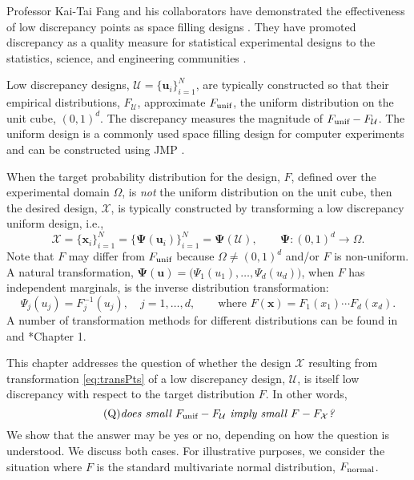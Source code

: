 \documentclass[graybox]{svmult}
\newcommand{\vx}{\boldsymbol{x}}
\newcommand{\vu}{\boldsymbol{u}}
\newcommand{\vPsi}{\boldsymbol{\Psi}}
\newcommand{\Udes}{\mathcal{U}}
\newcommand{\Xdes}{\mathcal{X}}
\newcommand{\Ftar}{F}
\newcommand{\cube}{\ensuremath{(0,1)^d}}
\newcommand{\unif}{\textup{unif}}
\newcommand{\normal}{\textup{normal}}
\begin{document}
Professor Kai-Tai Fang and his collaborators have demonstrated the effectiveness of low discrepancy points as space filling designs \cites{FangHic07a, FangEtal19a, FanLiSud06, FanWan94}. 
They have promoted discrepancy as a quality measure for statistical experimental designs to the statistics, science, and engineering communities \cites{FanMa01b, FanMaWin02, FanMuk00, FanMa01a}. 

Low discrepancy designs, $\Udes = \{\vu_i\}_{i=1}^N$, are typically constructed so that their empirical distributions, $F_\Udes$, approximate $F_\unif$, the uniform distribution on the unit cube, \cube.  
The discrepancy measures the magnitude of $F_\unif-F_\Udes$. 
The uniform design is a commonly used space filling design for computer experiments \cite{FanLiSud06} and can be constructed using  JMP\textsuperscript{\textregistered} \cite{sall2012jmp}.

When the target probability distribution for the design, $\Ftar$, defined over the experimental domain $\Omega$, is \emph{not} the uniform distribution on the unit cube, then the desired design, $\Xdes$, is typically constructed by transforming a low discrepancy uniform design, i.e., 
\begin{equation} \label{eq:transPts}
\Xdes = \{\vx_i\}_{i=1}^N = \{\vPsi(\vu_i)\}_{i=1}^N = \vPsi(\Udes), \qquad \vPsi: \cube \to \Omega.
\end{equation}
Note that $\Ftar$ may differ from $F_\unif$ because $\Omega \ne \cube$ and/or $\Ftar$ is non-uniform.  
A natural transformation, $\vPsi(\vu)=\bigl(\Psi_1(u_1),\ldots,\Psi_d(u_d) \bigr)$, when $\Ftar$ has independent marginals, is the inverse distribution transformation:
\begin{equation}\label{eq:inverse}
\Psi_j(u_j) = F_j^{-1}(u_j), \quad j =1, \ldots, d, \qquad \text{where } \Ftar(\vx) = F_1(x_1) \cdots F_d(x_d).
\end{equation}
A number of transformation methods for different distributions can be found in \cite{DEVROYE200683} and \cite{FanWan94}*{Chapter 1}.

This chapter addresses the question of whether the design $\Xdes$ resulting from transformation \eqref{eq:transPts} of a low discrepancy design, $\Udes$, is itself low discrepancy with respect to the target distribution $\Ftar$. 
In other words, 
\begin{equation} \label{eq:BigQ} \tag{Q}
\text{\emph{does small $F_\unif - F_\Udes$ imply small $\Ftar - F_\Xdes$?}}
\end{equation}
We show that the answer may be yes or no, depending on how the question is understood.  
We discuss both cases.  
For illustrative purposes, we consider the situation where $\Ftar$ is the standard multivariate normal distribution, $F_\normal$.
\end{document}
